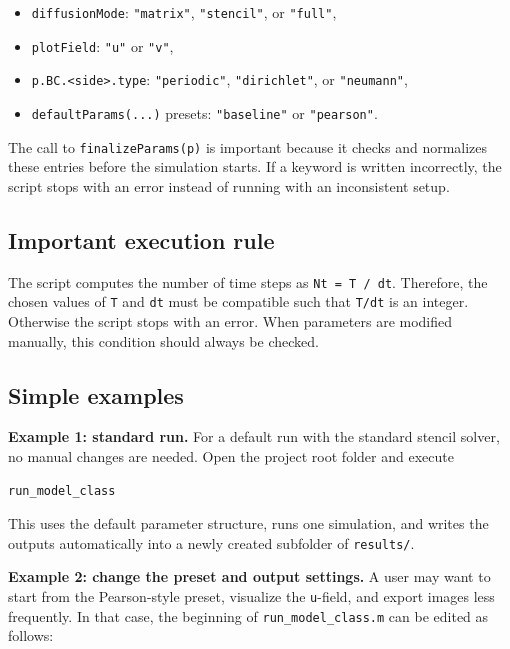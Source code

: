 \begin{itemize}
    \item \texttt{diffusionMode}: \texttt{"matrix"}, \texttt{"stencil"}, or \texttt{"full"},
    \item \texttt{plotField}: \texttt{"u"} or \texttt{"v"},
    \item \texttt{p.BC.<side>.type}: \texttt{"periodic"}, \texttt{"dirichlet"}, or \texttt{"neumann"},
    \item \texttt{defaultParams(...)} presets: \texttt{"baseline"} or \texttt{"pearson"}.
\end{itemize}

The call to \texttt{finalizeParams(p)} is important because it checks and normalizes these entries before the simulation starts. If a keyword is written incorrectly, the script stops with an error instead of running with an inconsistent setup.

\subsection*{Important execution rule}

The script computes the number of time steps as \texttt{Nt = T / dt}. Therefore, the chosen values of \texttt{T} and \texttt{dt} must be compatible such that \texttt{T/dt} is an integer. Otherwise the script stops with an error. When parameters are modified manually, this condition should always be checked.

\subsection*{Simple examples}

\textbf{Example 1: standard run.}  
For a default run with the standard stencil solver, no manual changes are needed. Open the project root folder and execute

\begin{verbatim}
run_model_class
\end{verbatim}

This uses the default parameter structure, runs one simulation, and writes the outputs automatically into a newly created subfolder of \texttt{results/}.

\medskip

\textbf{Example 2: change the preset and output settings.}  
A user may want to start from the Pearson-style preset, visualize the \texttt{u}-field, and export images less frequently. In that case, the beginning of \texttt{run\_model\_class.m} can be edited as follows:

